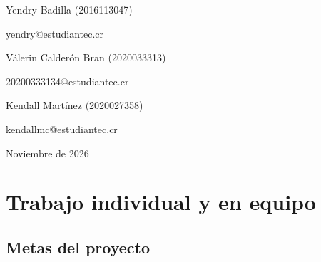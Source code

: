 \documentclass[12pt,a4paper]{article}
\begin{document}
\begin{titlepage}
    \vspace{0.4cm}

    Yendry Badilla (2016113047)\\
    {\small yendry@estudiantec.cr\par}

    \vspace{0.4cm}

    Válerin Calderón Bran (2020033313)\\
    {\small 20200333134@estudiantec.cr\par}

    \vspace{0.4cm}

    Kendall Martínez (2020027358)\\
    {\small kendallmc@estudiantec.cr\par}

    \vfill

    {\large Noviembre de 2026\par}

    \vspace{0.3cm}


\end{titlepage}


\section{Trabajo individual y en equipo}

\subsection{Metas del proyecto}
\end{document}
